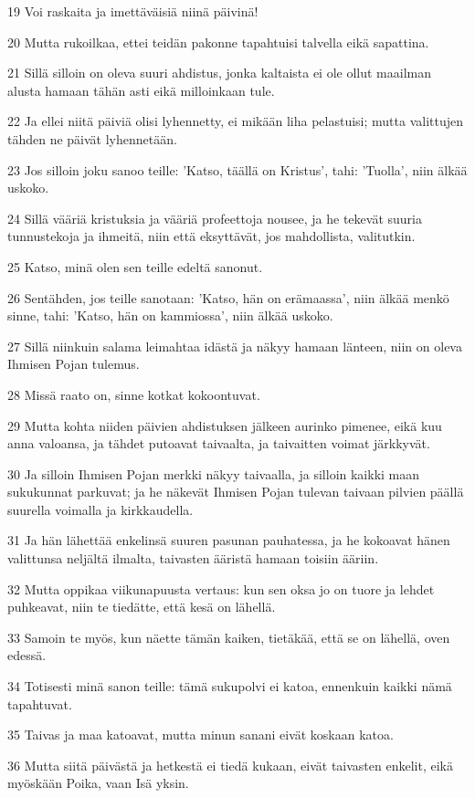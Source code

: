 \par 19 Voi raskaita ja imettäväisiä niinä päivinä!
\par 20 Mutta rukoilkaa, ettei teidän pakonne tapahtuisi talvella eikä sapattina.
\par 21 Sillä silloin on oleva suuri ahdistus, jonka kaltaista ei ole ollut maailman alusta hamaan tähän asti eikä milloinkaan tule.
\par 22 Ja ellei niitä päiviä olisi lyhennetty, ei mikään liha pelastuisi; mutta valittujen tähden ne päivät lyhennetään.
\par 23 Jos silloin joku sanoo teille: 'Katso, täällä on Kristus', tahi: 'Tuolla', niin älkää uskoko.
\par 24 Sillä vääriä kristuksia ja vääriä profeettoja nousee, ja he tekevät suuria tunnustekoja ja ihmeitä, niin että eksyttävät, jos mahdollista, valitutkin.
\par 25 Katso, minä olen sen teille edeltä sanonut.
\par 26 Sentähden, jos teille sanotaan: 'Katso, hän on erämaassa', niin älkää menkö sinne, tahi: 'Katso, hän on kammiossa', niin älkää uskoko.
\par 27 Sillä niinkuin salama leimahtaa idästä ja näkyy hamaan länteen, niin on oleva Ihmisen Pojan tulemus.
\par 28 Missä raato on, sinne kotkat kokoontuvat.
\par 29 Mutta kohta niiden päivien ahdistuksen jälkeen aurinko pimenee, eikä kuu anna valoansa, ja tähdet putoavat taivaalta, ja taivaitten voimat järkkyvät.
\par 30 Ja silloin Ihmisen Pojan merkki näkyy taivaalla, ja silloin kaikki maan sukukunnat parkuvat; ja he näkevät Ihmisen Pojan tulevan taivaan pilvien päällä suurella voimalla ja kirkkaudella.
\par 31 Ja hän lähettää enkelinsä suuren pasunan pauhatessa, ja he kokoavat hänen valittunsa neljältä ilmalta, taivasten ääristä hamaan toisiin ääriin.
\par 32 Mutta oppikaa viikunapuusta vertaus: kun sen oksa jo on tuore ja lehdet puhkeavat, niin te tiedätte, että kesä on lähellä.
\par 33 Samoin te myös, kun näette tämän kaiken, tietäkää, että se on lähellä, oven edessä.
\par 34 Totisesti minä sanon teille: tämä sukupolvi ei katoa, ennenkuin kaikki nämä tapahtuvat.
\par 35 Taivas ja maa katoavat, mutta minun sanani eivät koskaan katoa.
\par 36 Mutta siitä päivästä ja hetkestä ei tiedä kukaan, eivät taivasten enkelit, eikä myöskään Poika, vaan Isä yksin.
